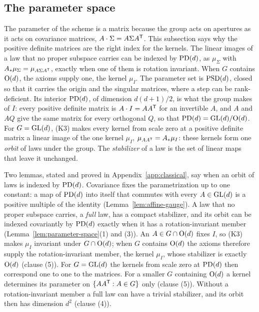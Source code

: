 \subsection{The parameter space}\label{sec:parameter-space}

The parameter of the scheme is a matrix because the group acts on apertures as it acts on
covariance matrices, $A \cdot \Sigma = A\Sigma A^{\mathsf{T}}$. This subsection says why the positive
definite matrices are the right index for the kernels.
The linear images of a law that no proper subspace carries can be indexed by $\mathrm{PD}(d)$, as
$\mu_\Sigma$ with $A_*\mu_\Sigma = \mu_{A\Sigma A^{\mathsf{T}}}$, exactly when one of them is rotation
invariant. When $G$ contains $\mathrm{O}(d)$, the axioms supply one, the kernel
$\mu_I$. The parameter set is $\mathrm{PSD}(d)$, closed so that it carries the origin and the singular matrices, where a
step can be rank-deficient. Its interior $\mathrm{PD}(d)$, of dimension $d(d+1)/2$, is what the group makes
of $I$: every positive definite matrix is $A \cdot I = AA^{\mathsf{T}}$ for an invertible $A$, and $A$ and
$AQ$ give the same matrix for every orthogonal $Q$, so that $\mathrm{PD}(d) = \mathrm{GL}(d)/\mathrm{O}(d)$. For
$G = \mathrm{GL}(d)$, (K3) makes every kernel from scale zero at a positive definite matrix a linear image
of the one kernel $\mu_I$, $\mu_{AA^{\mathsf{T}}} = A_*\mu_I$: these kernels form one \emph{orbit} of laws
under the group. The \emph{stabilizer} of a law is the set of linear maps that leave it unchanged.

Two lemmas, stated and proved in Appendix~\ref{app:classical}, say when an orbit of laws is indexed
by $\mathrm{PD}(d)$. Covariance fixes the parametrization up to one constant: a map of $\mathrm{PD}(d)$ into itself
that commutes with every $A \in \mathrm{GL}(d)$ is a positive multiple of the identity
(Lemma~\ref{lem:affine-gauge}). A law that no proper subspace carries, a \emph{full} law, has a
compact stabilizer, and its orbit can be indexed covariantly by $\mathrm{PD}(d)$ exactly when it has a
rotation-invariant member (Lemma~\ref{lem:parameter-space}(1) and (3)). An $A \in G \cap \mathrm{O}(d)$
fixes $I$, so (K3) makes $\mu_I$ invariant under $G \cap \mathrm{O}(d)$; when $G$ contains $\mathrm{O}(d)$ the
axioms therefore supply the rotation-invariant member, the kernel $\mu_I$, whose stabilizer is
exactly $\mathrm{O}(d)$ (clause (5)). For $G = \mathrm{GL}(d)$ the kernels from scale zero at $\mathrm{PD}(d)$ then
correspond one to one to the matrices. For a smaller $G$ containing $\mathrm{O}(d)$ a kernel determines
its parameter on $\{AA^{\mathsf{T}} : A \in G\}$ only (clause (5)). Without a rotation-invariant member a
full law can have a trivial stabilizer, and its orbit then has dimension $d^2$ (clause (4)).

